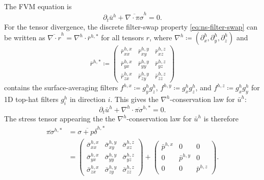\documentclass[preprint,twocolumn,5p]{elsarticle}
\begin{document}
The FVM equation is
\begin{equation}
    \partial_t \bar{u}^h + \overline{\nabla \cdot \pi \sigma}^h = 0.
\end{equation}
For the tensor divergence,
the discrete filter-swap property \eqref{eq:ns-filter-swap} can be written as
$\overline{\nabla \cdot r}^h = \nabla^h \cdot \bar{r}^{h, *}$ for all tensors $r$,
where
$\nabla^h \coloneq (\partial^h_x, \partial^h_y, \partial^h_z)$ and
\begin{equation}
    \bar{r}^{h, *} \coloneq \begin{pmatrix}
        \bar{r}_{x x}^{h, x} &
        \bar{r}_{x y}^{h, y} &
        \bar{r}_{x z}^{h, z} \\
        \bar{r}_{y x}^{h, x} &
        \bar{r}_{y y}^{h, y} &
        \bar{r}_{y z}^{h, z} \\
        \bar{r}_{z x}^{h, x} &
        \bar{r}_{z y}^{h, y} &
        \bar{r}_{z z}^{h, z}
    \end{pmatrix}
\end{equation}
contains the surface-averaging filters 
$f^{h, x} \coloneq g^h_y g^h_z$,
$f^{h, y} \coloneq g^h_x g^h_z$, and
$f^{h, z} \coloneq g^h_x g^h_y$
for 1D top-hat filters $g^h_i$ in direction $i$.
This gives the $\nabla^h$-conservation law for $\bar{u}^h$:
\begin{equation}
    \partial_t \bar{u}^h + \nabla^h \cdot \overline{\pi \sigma}^{h, *} = 0.
\end{equation}
The stress tensor appearing the the $\nabla^h$-conservation law for $\bar{u}^h$ is therefore
\begin{equation}
\begin{split}
    \overline{\pi \sigma}^{h, *}
    & = \overline{\sigma + p \delta}^{h, *} \\
    & = \begin{pmatrix}
        \bar{\sigma}_{x x}^{h, x} &
        \bar{\sigma}_{x y}^{h, y} &
        \bar{\sigma}_{x z}^{h, z} \\
        \bar{\sigma}_{y x}^{h, x} &
        \bar{\sigma}_{y y}^{h, y} &
        \bar{\sigma}_{y z}^{h, z} \\
        \bar{\sigma}_{z x}^{h, x} &
        \bar{\sigma}_{z y}^{h, y} &
        \bar{\sigma}_{z z}^{h, z}
    \end{pmatrix} +
    \begin{pmatrix}
        \bar{p}^{h, x} & 0 & 0 \\
        0 & \bar{p}^{h, y} & 0 \\
        0 & 0 & \bar{p}^{h, z}
    \end{pmatrix}.
\end{split}
\end{equation}
\end{document}
